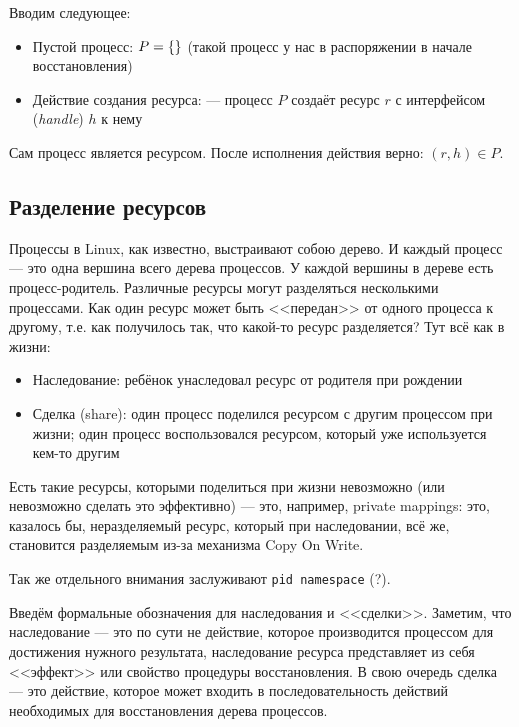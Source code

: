 Вводим следующее:

\begin{itemize}
	\item Пустой процесс: $P = \left\lbrace  \right\rbrace$ (такой процесс у нас в распоряжении в начале восстановления)
	\item Действие создания ресурса:  --- процесс $P$ создаёт ресурс $r$ с интерфейсом (\textit{handle}) $h$ к нему
\end{itemize}

Сам процесс является ресурсом. После исполнения действия  верно: $(r, h) \in P$.

\subsection{Разделение ресурсов}

Процессы в Linux, как известно, выстраивают собою дерево. И каждый процесс --- это одна вершина всего дерева процессов. У каждой вершины в дереве есть процесс-родитель. Различные ресурсы могут разделяться несколькими процессами. Как один ресурс может быть <<передан>> от одного процесса к другому, т.е. как получилось так, что какой-то ресурс разделяется? Тут всё как в жизни:

\begin{itemize}
	\item Наследование: ребёнок унаследовал ресурс от родителя при рождении
	\item Сделка (share): один процесс поделился ресурсом с другим процессом при жизни; один процесс воспользовался ресурсом, который уже используется кем-то другим
\end{itemize}

Есть такие ресурсы, которыми поделиться при жизни невозможно (или невозможно сделать это эффективно) --- это, например, private mappings: это, казалось бы, неразделяемый ресурс, который при наследовании, всё же, становится разделяемым из-за механизма Copy On Write.

Так же отдельного внимания заслуживают \texttt{pid namespace} (?).

Введём формальные обозначения для наследования и <<сделки>>. Заметим, что наследование --- это по сути не действие, которое производится процессом для достижения нужного результата, наследование ресурса представляет из себя <<эффект>> или свойство процедуры восстановления. В свою очередь сделка --- это действие, которое может входить в последовательность действий необходимых для восстановления дерева процессов.

